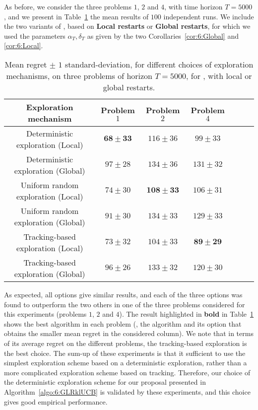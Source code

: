 As before, we consider the three problems $1$, $2$ and $4$, with time horizon $T=5000$,
and we present in Table~\ref{table:6:exploringDifferentForcedExplorationMechanisms} the mean results of $100$ independent runs.
We include the two variants of \GLRklUCB, based on \textbf{Local restarts} or \textbf{Global restarts}, for which we used the parameters $\alpha_T,\delta_T$ as given by the two Corollaries~\ref{cor:6:Global} and \ref{cor:6:Local}.

\begin{table}[ht]
    \centering
    \begin{tabular}{c|cccccc}
        \textbf{Exploration mechanism} & Problem $1$ & Problem $2$ & Problem $4$ \\
        \hline
        Deterministic exploration (Local)   & $\mathbf{68 \pm 33}$ & $116 \pm 36$ & $99 \pm 33$ \\
        Deterministic exploration (Global)  & $97 \pm 28$ & $134 \pm 36$ & $131 \pm 32$ \\
        \hline
        Uniform random exploration (Local)  & $74 \pm 30$ & $\mathbf{108 \pm 33}$ & $106 \pm 31$ \\
        Uniform random exploration (Global) & $91 \pm 30$ & $134 \pm 33$ & $129 \pm 33$ \\
        \hline
        Tracking-based exploration (Local)  & $73 \pm 32$ & $104 \pm 33$ & $\mathbf{89 \pm 29}$ \\
        Tracking-based exploration (Global) & $96 \pm 26$ & $133 \pm 32$ & $120 \pm 30$
    \end{tabular}
    \caption{Mean regret $\pm$ $1$ standard-deviation, for different choices of exploration mechanisms, on three problems of horizon $T=5000$, for \GLRklUCB, with local or global restarts.}
    \label{table:6:exploringDifferentForcedExplorationMechanisms}
\end{table}

As expected, all options give similar results, and each of the three options was found to outperform the two others in one of the three problems considered for this experiments (problems $1$, $2$ and $4$).
The result highlighted in \textbf{bold} in Table~\ref{table:6:exploringDifferentForcedExplorationMechanisms} shows the best algorithm in each problem (\ie, the algorithm and its option that obtains the smaller mean regret in the considered column).
We note that in terms of its average regret on the different problems, the tracking-based exploration is the best choice.
%
The sum-up of these experiments is that it sufficient to use the simplest exploration scheme based on a deterministic exploration,
rather than a more complicated exploration scheme based on tracking.
Therefore, our choice of the deterministic exploration scheme for our proposal \GLRklUCB{} presented in Algorithm~\ref{algo:6:GLRklUCB} is validated by these experiments, and this choice gives good empirical performance.
